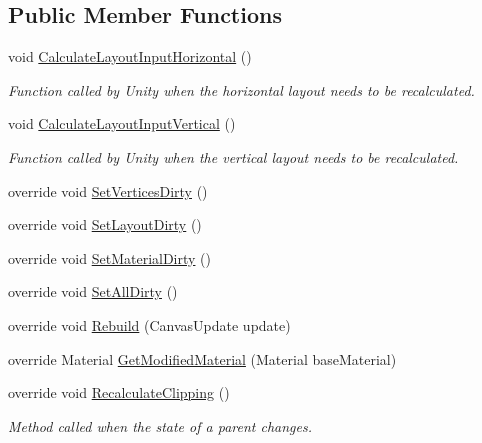 \subsection*{Public Member Functions}
\begin{DoxyCompactItemize}
\item 
void \mbox{\hyperlink{class_t_m_pro_1_1_text_mesh_pro_u_g_u_i_a2a8879e4aa818ad1338e1cbf2ca31b6d}{Calculate\+Layout\+Input\+Horizontal}} ()
\begin{DoxyCompactList}\small\item\em Function called by Unity when the horizontal layout needs to be recalculated. \end{DoxyCompactList}\item 
void \mbox{\hyperlink{class_t_m_pro_1_1_text_mesh_pro_u_g_u_i_a5d1d50b2bf96c764e4decc60c0b5762c}{Calculate\+Layout\+Input\+Vertical}} ()
\begin{DoxyCompactList}\small\item\em Function called by Unity when the vertical layout needs to be recalculated. \end{DoxyCompactList}\item 
override void \mbox{\hyperlink{class_t_m_pro_1_1_text_mesh_pro_u_g_u_i_acc18f45edf09f79d04d6a9e461633d7c}{Set\+Vertices\+Dirty}} ()
\item 
override void \mbox{\hyperlink{class_t_m_pro_1_1_text_mesh_pro_u_g_u_i_a662b65a09b65317f716297d4377e27a7}{Set\+Layout\+Dirty}} ()
\item 
override void \mbox{\hyperlink{class_t_m_pro_1_1_text_mesh_pro_u_g_u_i_af75e3f762ed8c445cc4ad100903b5cf1}{Set\+Material\+Dirty}} ()
\item 
override void \mbox{\hyperlink{class_t_m_pro_1_1_text_mesh_pro_u_g_u_i_a749eb1a6e9aa2f277b07a01f14483cc3}{Set\+All\+Dirty}} ()
\item 
override void \mbox{\hyperlink{class_t_m_pro_1_1_text_mesh_pro_u_g_u_i_a963457c98b96eb2387dd43d40a7dcc57}{Rebuild}} (Canvas\+Update update)
\item 
override Material \mbox{\hyperlink{class_t_m_pro_1_1_text_mesh_pro_u_g_u_i_ad9e0ee518fca96a5879709f7e2c378f1}{Get\+Modified\+Material}} (Material base\+Material)
\item 
override void \mbox{\hyperlink{class_t_m_pro_1_1_text_mesh_pro_u_g_u_i_ada791339448a5b531f1bf276108b2b8c}{Recalculate\+Clipping}} ()
\begin{DoxyCompactList}\small\item\em Method called when the state of a parent changes. \end{DoxyCompactList}\item 

\end{DoxyCompactItemize}

